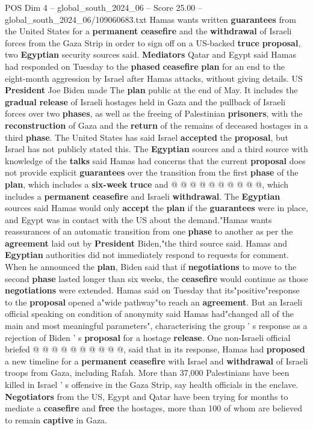 \begin{textsample}{POS Dim 4 – global\_south\_2024\_06 – Score 25.00 – global\_south\_2024\_06/109060683.txt}  \label{ex:f4_pos_086}
Hamas wants written \textbf{guarantees} from the United States for a \textbf{permanent} \textbf{ceasefire} and the \textbf{withdrawal} of Israeli forces from the Gaza Strip in order to sign off on a US-backed \textbf{truce} \textbf{proposal}, two \textbf{Egyptian} security sources said. \textbf{Mediators} Qatar and Egypt said Hamas had responded on Tuesday to the \textbf{phased} \textbf{ceasefire} \textbf{plan} for an end to the eight-month aggression by Israel after Hamas attacks, without giving details.
US \textbf{President} Joe Biden made The \textbf{plan} public at the end of May.
It includes the \textbf{gradual} \textbf{release} of Israeli hostages held in Gaza and the pullback of Israeli forces over two \textbf{phases}, as well as the freeing of Palestinian \textbf{prisoners}, with the \textbf{reconstruction} of Gaza and the \textbf{return} of the remains of deceased hostages in a third \textbf{phase}.
The United States has said Israel \textbf{accepted} the \textbf{proposal}, but Israel has not publicly stated this.
The \textbf{Egyptian} sources and a third source with knowledge of the \textbf{talks} said Hamas had concerns that the current \textbf{proposal} does not provide explicit \textbf{guarantees} over the transition from the first \textbf{phase} of the \textbf{plan}, which includes a \textbf{six-week} \textbf{truce} and @ @ @ @ @ @ @ @ @ @, which includes a \textbf{permanent} \textbf{ceasefire} and Israeli \textbf{withdrawal}.
The \textbf{Egyptian} sources said Hamas would only \textbf{accept} the \textbf{plan} if the \textbf{guarantees} were in place, and Egypt was in contact with the US about the demand."Hamas wants reassurances of an automatic transition from one \textbf{phase} to another as per the \textbf{agreement} laid out by \textbf{President} Biden,"the third source said.
Hamas and \textbf{Egyptian} authorities did not immediately respond to requests for comment.
When he announced the \textbf{plan}, Biden said that if \textbf{negotiations} to move to the second \textbf{phase} lasted longer than six weeks, the \textbf{ceasefire} would continue as those \textbf{negotiations} were extended.
Hamas said on Tuesday that its"positive"response to the \textbf{proposal} opened a"wide pathway"to reach an \textbf{agreement}.
But an Israeli official speaking on condition of anonymity said Hamas had"changed all of the main and most meaningful parameters", characterising the group ' s response as a rejection of Biden ' s \textbf{proposal} for a hostage \textbf{release}.
One non-Israeli official briefed @ @ @ @ @ @ @ @ @ @, said that in its response, Hamas had \textbf{proposed} a new timeline for a \textbf{permanent} \textbf{ceasefire} with Israel and \textbf{withdrawal} of Israeli troops from Gaza, including Rafah.
More than 37,000 Palestinians have been killed in Israel ' s offensive in the Gaza Strip, say health officials in the enclave. \textbf{Negotiators} from the US, Egypt and Qatar have been trying for months to mediate a \textbf{ceasefire} and \textbf{free} the hostages, more than 100 of whom are believed to remain \textbf{captive} in Gaza.


\end{textsample}
